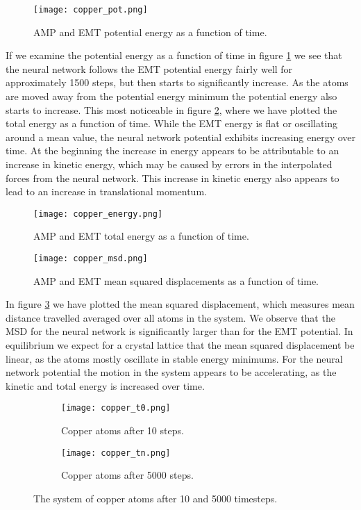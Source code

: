 \begin{figure}[H]
    \centering
    \texttt{[image: copper\_pot.png]}
    \caption{AMP and EMT potential energy as a function of time.}
    \label{fig:copper-pot}
\end{figure}

If we examine the potential energy as a function of time
in figure \ref{fig:copper-pot} we see that the neural network
follows the EMT potential energy fairly well for approximately
1500 steps, but then starts to significantly increase.
As the atoms are moved away from the potential
energy minimum the potential energy also starts to increase.
This most noticeable in figure \ref{fig:copper-energy},
where we have plotted the total energy as a function of time.
While the EMT energy is flat or oscillating around a mean value,
the neural network potential exhibits increasing energy over time.
At the beginning the increase in energy appears to be attributable
to an increase in kinetic energy, which may be caused by errors
in the interpolated forces from the neural network.
This increase in kinetic energy also appears to lead to an increase
in translational momentum.

\begin{figure}[H]
    \centering
    \texttt{[image: copper\_energy.png]}
    \caption{AMP and EMT total energy as a function of time.}
    \label{fig:copper-energy}
\end{figure}

\begin{figure}[H]
    \centering
    \texttt{[image: copper\_msd.png]}
    \caption{AMP and EMT mean squared displacements as a function of time.}
    \label{fig:copper-msd}
\end{figure}

In figure \ref{fig:copper-msd} we have plotted the mean squared
displacement, which measures mean distance travelled averaged over all
atoms in the system.
We observe that the MSD for the neural network is significantly larger
than for the EMT potential. In equilibrium we expect for a crystal lattice
that the mean squared displacement be linear, as the atoms
mostly oscillate in stable energy minimums.
For the neural network potential the motion in the system appears
to be accelerating, as the kinetic and total energy is increased
over time.

\begin{figure}[H]
\begin{adjustbox}{max width=1.2\linewidth,center}
\centering
  \begin{subfigure}[b]{0.55\textwidth}
      \texttt{[image: copper\_t0.png]}
      \caption{Copper atoms after 10 steps.}
    \label{fig:f1}
  \end{subfigure}
  \hfill
  \begin{subfigure}[b]{0.55\textwidth}
      \texttt{[image: copper\_tn.png]}
      \caption{Copper atoms after 5000 steps.}
    \label{fig:f2}
  \end{subfigure}
\end{adjustbox}
    \caption{The system of copper atoms after 10 and 5000 timesteps.}
    \label{fig:copper_sw}
\end{figure}

